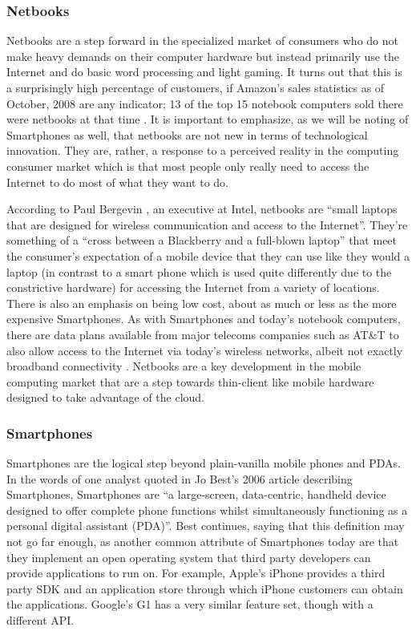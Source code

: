 \documentclass[12pt,oneside,letterpaper,titlepage]{article}
\begin{document}
\subsubsection{Netbooks}

Netbooks are a step forward in the specialized market of consumers who do not
make heavy demands on their computer hardware but instead primarily use the
Internet and do basic word processing and light gaming.  It turns out that this
is a surprisingly high percentage of customers, if Amazon's sales statistics as
of October, 2008 are any indicator; 13 of the top 15 notebook computers sold
there were netbooks at that time \citep{copeland2008}.  It is important to
emphasize, as we will be noting of Smartphones as well, that netbooks are not
new in terms of technological innovation.  They are, rather, a response to a
perceived reality in the computing consumer market which is that most people
only really need to access the Internet to do most of what they want to do.

According to Paul Bergevin \citeyearpar{bergevin2008}, an executive at Intel,
netbooks are ``small laptops that are designed for wireless communication and
access to the Internet''.  They're something of a ``cross between a Blackberry
and a full-blown laptop'' \citep{copeland2008} that meet the consumer's
expectation of a mobile device that they can use like they would a laptop (in
contrast to a smart phone which is used quite differently due to the
constrictive hardware) for accessing the Internet from a variety of locations.
There is also an emphasis on being low cost, about as much or less as the more
expensive Smartphones.  As with Smartphones and today's notebook computers,
there are data plans available from major telecoms companies such as AT\&T to
also allow access to the Internet via today's wireless networks, albeit not
exactly broadband connectivity \citep{ap2009}.  Netbooks are a key development
in the mobile computing market that are a step towards thin-client like mobile
hardware designed to take advantage of the cloud.

\subsubsection{Smartphones}

Smartphones are the logical step beyond plain-vanilla mobile phones and PDAs.
In the words of one analyst quoted in Jo Best's 2006 article describing
Smartphones, Smartphones are ``a large-screen, data-centric, handheld device
designed to offer complete phone functions whilst simultaneously functioning as
a personal digital assistant (PDA)''.  Best continues, saying that this
definition may not go far enough, as another common attribute of Smartphones
today are that they implement an open operating system that third party
developers can provide applications to run on.  For example, Apple's iPhone
provides a third party SDK and an application store through which iPhone
customers can obtain the applications.  Google's G1 has a very similar feature
set, though with a different API.
\end{document}
